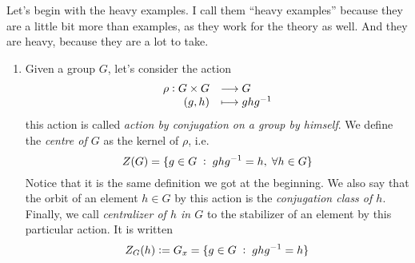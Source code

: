 \documentclass[../main.tex]{subfiles}
\begin{document}
\begin{ej}\label{ej:heavyexamplesactions}
Let's begin with the heavy examples. I call them ``heavy examples'' because they are a little bit more than examples, as they work for the theory as well. And they are heavy, because they are a lot to take.
\begin{enumerate}[(1)]
    \item Given a group $G$, let's consider the action
    \begin{equation}
        \notag
        \begin{array}{rl}
            \rho:G\times G & \longrightarrow G \\
            (g,h) & \longmapsto ghg^{-1}
        \end{array}
    \end{equation}
    this action is called \textit{action by conjugation on a group by himself}. We define the \textit{centre of $G$} as the kernel of $\rho$, i.e.
    \begin{equation}
        \notag
        Z(G) = \{g\in G\;:\;ghg^{-1} = h,\;\forall h\in G\}
    \end{equation}
    Notice that it is the same definition we got at the beginning. We also say that the orbit of an element $h\in G$ by this action is the \textit{conjugation class of $h$}. Finally, we call \textit{centralizer of $h$ in $G$} to the stabilizer of an element by this particular action. It is written
    \begin{equation}
        \notag
        Z_G(h):=G_x = \{g\in G\;:\;ghg^{-1} = h\}
    \end{equation}
    

\end{enumerate}
\end{ej}
\end{document}
